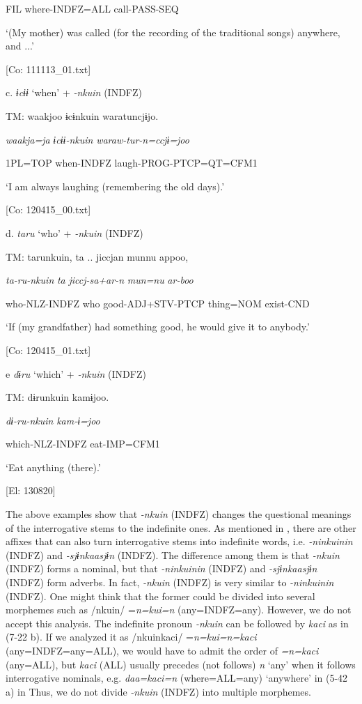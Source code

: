       FIL  where-INDFZ=ALL  call-PASS-SEQ

      ‘(My mother) was called (for the recording of the traditional songs) anywhere, and ...’

      [Co: 111113\_01.txt]

  c.  \textit{ɨcɨɨ} ‘when’ + \textit{{}-nkuin} (INDFZ)

    TM:  waakjoo  ɨcɨnkuin  waratuncjɨjo.

      \textit{waakja=ja}  \textit{ɨcɨɨ-nkuin}  \textit{waraw-tur-n=ccjɨ=joo}

      1PL=TOP  when-INDFZ  laugh-PROG-PTCP=QT=CFM1

      ‘I am always laughing (remembering the old days).’

      [Co: 120415\_00.txt]

  d.  \textit{taru} ‘who’ + \textit{{}-nkuin} (INDFZ)

    TM:  tarunkuin,  ta ..  jiccjan  munnu  appoo,

      \textit{ta-ru-nkuin}  \textit{ta}  \textit{jiccj-sa+ar-n}  \textit{mun=nu}  \textit{ar-boo}

      who-NLZ-INDFZ  who  good-ADJ+STV-PTCP  thing=NOM  exist-CND

      ‘If (my grandfather) had something good, he would give it to anybody.’

      [Co: 120415\_01.txt]

  e  \textit{dɨru} ‘which’ + \textit{{}-nkuin} (INDFZ)

    TM:  dɨrunkuin  kamɨjoo.

      \textit{dɨ-ru-nkuin}  \textit{kam-ɨ=joo}

      which-NLZ-INDFZ  eat-IMP=CFM1

      ‘Eat anything (there).’

      [El: 130820]

The above examples show that \textit{{}-nkuin} (INDFZ) changes the questional meanings of the interrogative stems to the indefinite ones. As mentioned in , there are other affixes that can also turn interrogative stems into indefinite words, i.e. \textit{{}-ninkuinin} (INDFZ) and \textit{{}-sjɨnkaasjɨn} (INDFZ). The difference among them is that \textit{{}-nkuin} (INDFZ) forms a nominal, but that \textit{{}-ninkuinin} (INDFZ) and \textit{{}-sjɨnkaasjɨn} (INDFZ) form adverbs. In fact, \textit{{}-nkuin} (INDFZ) is very similar to \textit{{}-ninkuinin} (INDFZ). One might think that the former could be divided into several morphemes such as /nkuin/ =\textit{n=kui=n} (any=INDFZ=any). However, we do not accept this analysis. The indefinite pronoun \textit{{}-nkuin} can be followed by \textit{kaci} as in (7-22 b). If we analyzed it as /nkuinkaci/ =\textit{n=kui=n=kaci} (any=INDFZ=any=ALL), we would have to admit the order of \textit{=n=kaci} (any=ALL), but \textit{kaci} (ALL) usually precedes (not follows) \textit{n} ‘any’ when it follows interrogative nominals, e.g. \textit{daa=kaci=n} (where=ALL=any) ‘anywhere’ in (5-42 a) in  Thus, we do not divide \textit{{}-nkuin} (INDFZ) into multiple morphemes.

